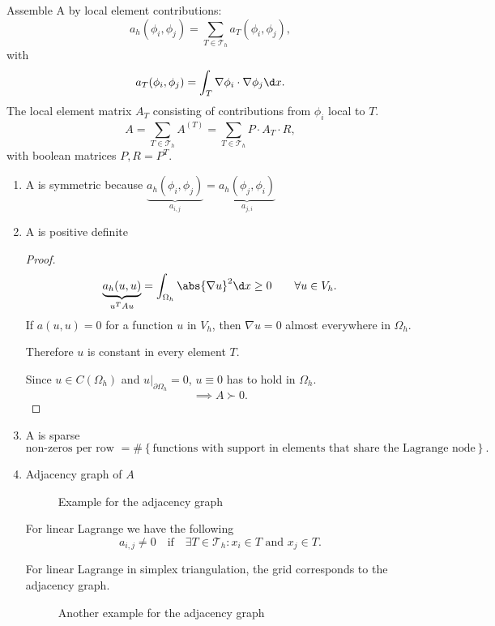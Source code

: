 Assemble A by local element contributions:
\[
	a_{h}(\phi _{i}, \phi _{j}) = \sum_{T \in \mathcal{T}_{h}}^{}{a_{T}(\phi _{i}, \phi _{j})}
,\] 
with
\[
	a_{T}(\phi _{i}, \phi _{j}) = \int_{T}\nabla \phi _{i}\cdot \nabla \phi _{j} \d x
.\]
The local element matrix $A_{T}$ consisting of contributions from $\phi _{i}$ local to $T$.
\[
	A = \sum_{T \in \mathcal{T}_{h}}^{}{A^{(T)}}= \sum_{T \in \mathcal{T}_{h}}^{}{P\cdot A_{T} \cdot R}
,\] 
with boolean matrices $P, R = P^{T}$.

\begin{enumerate}[label=\alph{enumi})]
	\item A is symmetric because $ \underbrace{a_{h}(\phi
		_{i}, \phi _{j})}_{a_{i,j}} =
		\underbrace{a_{h}(\phi _{j}, \phi _{i})}_{a_{j,i}}
		$
	\item A is positive definite
		\begin{proof}
		\label{thm:Aispositivedefinite}
			\[
					\underbrace{a_{h}(u,u)}_{u^{T}Au} = \int_{\Omega_{h} }\abs{\nabla u} ^2 \d x \geq 0 \qquad \forall u \in V_{h}
			.\] 
			If  $a(u,u)=0$ for a function $u$ in $V_{h}$, then $\nabla u=0$ almost everywhere in $\Omega _{h}$.

			Therefore $u$ is constant in every element $T$.

			Since $u \in C(\Omega _{h})$ and $u|_{\partial \Omega _{h}}=0$, $u \equiv 0$ has to hold in $\Omega _{h}$.
			\[
			\implies A \succ 0
			.\] 
		\end{proof}

	\item A is sparse
		\[
		\text{non-zeros per row } = \#\left\{ \text{functions with support in elements that share the Lagrange node} \right\} 
		.\] 
	\item Adjacency graph of $A$

		\begin{figure}[H]
			\begin{center}
				
			\end{center}
			\caption{Example for the adjacency graph}
			\label{fig:adjacenygraph1}
		\end{figure}
		
		
		For linear Lagrange we have the following
		\[
		a_{i,j}\neq 0 \quad \text{if} \quad \exists T \in \mathcal{T}_{h}\colon x_{i}\in T \text{ and } x_{j} \in T
		.\] 

		For linear Lagrange in simplex triangulation, the grid corresponds to the adjacency graph.
		\begin{figure}[H]
			\begin{center}
				
			\end{center}
			\caption{Another example for the adjacency graph}
			\label{fig:adjacenygraph2}
		\end{figure}
		
\end{enumerate}

